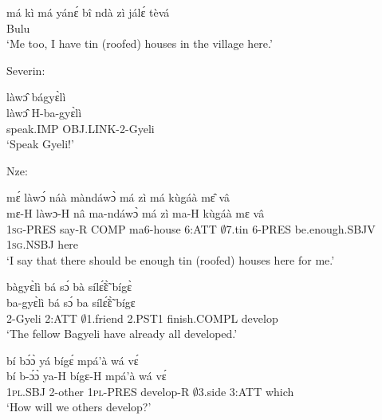 \begin{exe} 
\exC\label{32}
  \gll   má kì má yánɛ́ bî ndà zì jálɛ́ tèvá \\
             [1\textsc{sg} too 1\textsc{sg} have houses ATT tin village ATT here]Bulu\\
    \trans `Me too, I have tin (roofed) houses in the village here.'
\end{exe}

\noindent Severin:

\begin{exe} 
\exC\label{33}
  \glll    làwɔ̂ bágyɛ̀lì \\
           làwɔ̂ H-ba-gyɛ̀lì \\
            speak.IMP OBJ.LINK-2-Gyeli \\
    \trans `Speak Gyeli!'
\end{exe}

\noindent Nze:

\begin{exe} 
\exC\label{34} 
  \glll  mɛ́ làwɔ́ náà màndáwɔ̀ má zì má kùgáà mɛ̂ vâ \\
         mɛ-H làwɔ-H nâ ma-ndáwɔ̀ má zì ma-H kùgáà mɛ vâ \\
            1\textsc{sg}-PRES say-R COMP ma6-house 6:ATT $\emptyset$7.tin 6-PRES be.enough.SBJV 1\textsc{sg}.NSBJ here \\
    \trans `I say that there should be enough tin (roofed) houses here for me.'
\end{exe}

\begin{exe} 
\exC\label{35}
  \glll   bàgyɛ̀lì bá sɔ́ bà sílɛ̃́ɛ̃̀ bígɛ̀ \\
           ba-gyɛ̀lì bá sɔ́ ba sílɛ̃́ɛ̃̀ bígɛ\\
           2-Gyeli 2:ATT $\emptyset$1.friend 2.PST1 finish.COMPL develop  \\
    \trans `The fellow Bagyeli have already all developed.'
\end{exe}

\begin{exe} 
\exC\label{36}
  \glll   bí bɔ́ɔ̀ yá bígɛ́ mpá'à wá vɛ́ \\
           bí b-ɔ́ɔ̀ ya-H bígɛ-H mpá'à wá vɛ́ \\
           1\textsc{pl}.SBJ 2-other 1\textsc{pl}-PRES develop-R $\emptyset$3.side 3:ATT which  \\
    \trans `How will we others develop?'
\end{exe}

